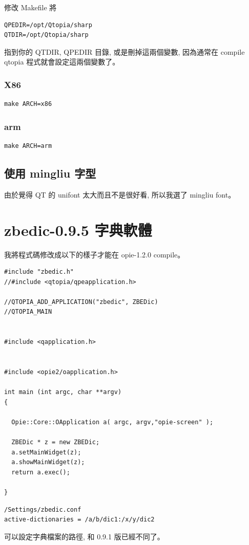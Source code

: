 \documentclass[12pt,a4paper]{article}
\begin{document}
\begin{CJK}{UTF8}{bsmi}
修改 Makefile 將
\begin{verbatim}
QPEDIR=/opt/Qtopia/sharp
QTDIR=/opt/Qtopia/sharp
\end{verbatim}
指到你的 QTDIR, QPEDIR 目錄, 或是刪掉這兩個變數,
因為通常在 compile qtopia 程式就會設定這兩個變數了。


\subsubsection{X86}
\begin{verbatim}
make ARCH=x86
\end{verbatim}
\subsubsection{arm}
\begin{verbatim}
make ARCH=arm
\end{verbatim}

\subsection{使用 mingliu 字型}
由於覺得 QT 的 unifont 太大而且不是很好看, 所以我選了 mingliu font。


\section{zbedic-0.9.5 字典軟體}

我將程式碼修改成以下的樣子才能在 opie-1.2.0 compile。
\begin{verbatim}
#include "zbedic.h"
//#include <qtopia/qpeapplication.h>

//QTOPIA_ADD_APPLICATION("zbedic", ZBEDic)
//QTOPIA_MAIN


#include <qapplication.h>


#include <opie2/oapplication.h>

int main (int argc, char **argv)
{

  Opie::Core::OApplication a( argc, argv,"opie-screen" );

  ZBEDic * z = new ZBEDic;
  a.setMainWidget(z);
  a.showMainWidget(z);
  return a.exec();

}
\end{verbatim}

\begin{verbatim}
/Settings/zbedic.conf
active-dictionaries = /a/b/dic1:/x/y/dic2
\end{verbatim}
可以設定字典檔案的路徑, 和 0.9.1 版已經不同了。


\end{CJK}
\end{document}
